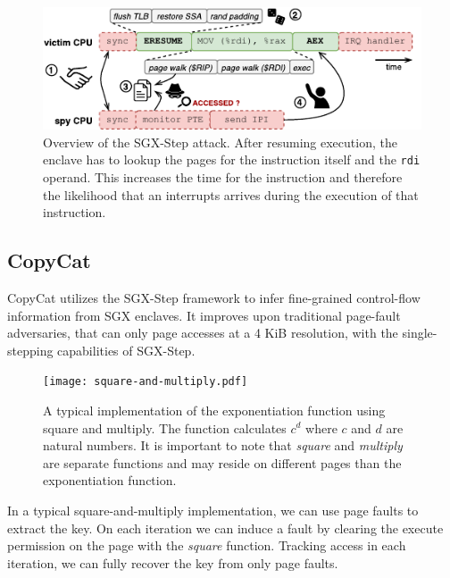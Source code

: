 \documentclass{llncs}
\begin{document}
\begin{figure}[t]
  \centering
  \includegraphics{images/sgx-step-pte.pdf}
  \caption{Overview of the SGX-Step attack.
    After resuming execution, the enclave has to lookup the pages for
    the instruction itself and the \texttt{rdi} operand. This increases the time
    for the instruction and therefore the likelihood that an interrupts arrives
    during the execution of that instruction.}
  \label{fig:sgx-step-pte}
\end{figure}


\subsection{CopyCat}

CopyCat \cite{MoghimiBHPS20} utilizes the SGX-Step framework
to infer fine-grained control-flow information from SGX enclaves.
It improves upon traditional page-fault adversaries,
that can only page accesses at a 4 KiB resolution,
with the single-stepping capabilities of SGX-Step.

\begin{figure}[t]
  \centering
  \texttt{[image: square-and-multiply.pdf]}
  \caption{A typical implementation of the exponentiation function using square and multiply.
    The function calculates $c^d$ where $c$ and $d$ are natural numbers.
    It is important to note that \emph{square} and \emph{multiply} are separate functions
    and may reside on different pages than the exponentiation function.}
  \label{fig:square-and-multiply}
\end{figure}

In a typical square-and-multiply implementation,
we can use page faults to extract the key.
On each iteration we can induce a fault by clearing the execute permission on
the page with the \emph{square} function.
Tracking access in each iteration, we can fully recover the key from only page faults.
\end{document}
